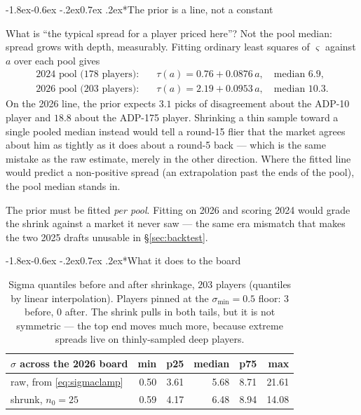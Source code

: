 \documentclass[10pt,a4paper]{article}
\makeatletter
\theoremstyle{plain}
\theoremstyle{definition}
\theoremstyle{remark}
\renewcommand\subsubsection{\@startsection{subsubsection}{3}{\z@}%
  {-1.8ex\@plus -0.6ex \@minus -.2ex}{0.7ex \@plus .2ex}{\normalfont\normalsize\bfseries}}
\makeatother
\begin{document}
\subsubsection*{The prior is a line, not a constant}

What is ``the typical spread for a player priced here''? Not the pool median: spread
grows with depth, measurably. Fitting ordinary least squares of $\varsigma$ against
$a$ over each pool gives
\begin{align}
\text{2024 pool ($178$ players):}\quad &\tau(a) = 0.76 + 0.0876\,a, \quad \text{median } 6.9, \label{eq:prior24}\\
\text{2026 pool ($203$ players):}\quad &\tau(a) = 2.19 + 0.0953\,a, \quad \text{median } 10.3. \label{eq:prior26}
\end{align}
On the 2026 line, the prior expects $3.1$ picks of disagreement about the ADP-10 player
and $18.8$ about the ADP-175 player. Shrinking a thin sample toward a single pooled
median instead would tell a round-15 flier that the market agrees about him as tightly
as it does about a round-5 back --- which is the same mistake as the raw estimate,
merely in the other direction. Where the fitted line would predict a non-positive
spread (an extrapolation past the ends of the pool), the pool median stands in.

The prior must be fitted \emph{per pool}. Fitting on 2026 and scoring 2024 would grade
the shrink against a market it never saw --- the same era mismatch that makes the two
2025 drafts unusable in \S\ref{sec:backtest}.

\subsubsection*{What it does to the board}

\begin{table}[htbp]
\centering
\small
\begin{tabular}{lrrrrr}
\toprule
$\sigma$ across the 2026 board & min & p25 & median & p75 & max \\
\midrule
raw, from \eqref{eq:sigmaclamp}      & 0.50 & 3.61 & 5.68 & 8.71 & 21.61 \\
shrunk, $n_0 = 25$                   & 0.59 & 4.17 & 6.48 & 8.94 & 14.08 \\
\bottomrule
\end{tabular}
\caption{Sigma quantiles before and after shrinkage, $203$ players
(quantiles by linear interpolation). Players pinned at the $\sigma_{\min} = 0.5$ floor:
$3$ before, $0$ after. The shrink pulls in both tails, but it is not symmetric --- the
top end moves much more, because extreme spreads live on thinly-sampled deep players.}
\label{tab:shrink}
\end{table}
\end{document}
